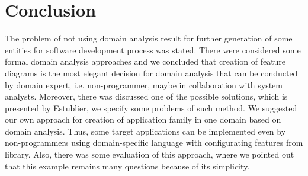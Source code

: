 \documentclass[conference]{IEEEtran}
\begin{document}
\section{Conclusion}
\label{chapter:conclusion}
The problem of not using domain analysis result for further generation of some entities for software development process was stated. There were considered some formal domain analysis approaches and we concluded that creation of feature diagrams is the most elegant decision for domain analysis that can be conducted by domain expert, i.e. non-programmer, maybe in collaboration with system analysts. Moreover, there was discussed one of the possible solutions, which is presented by Estublier, we specify some problems of such method. We suggested our own approach for creation of application family in one domain based on domain analysis. Thus, some target applications can be implemented even by non-programmers using domain-specific language with configurating features from library. Also, there was some evaluation of this approach, where we pointed out that this example remains many questions because of its simplicity.




\end{document}
